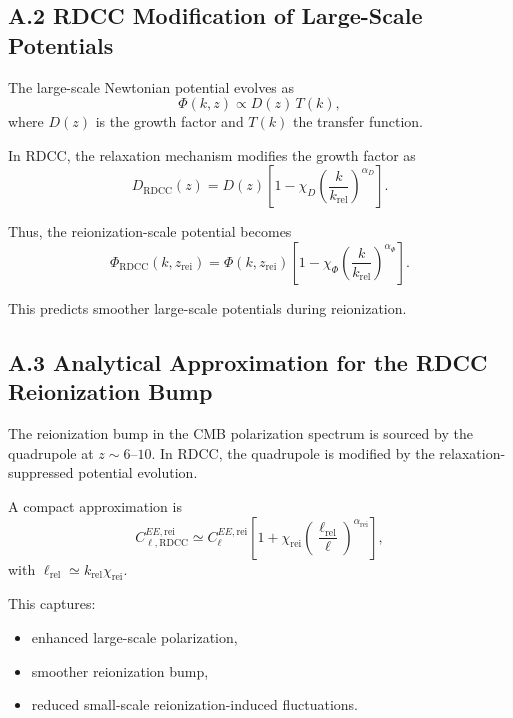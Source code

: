 \documentclass[11pt,a4paper]{article}
\begin{document}
\subsection*{A.2 RDCC Modification of Large-Scale Potentials}

The large-scale Newtonian potential evolves as
\begin{equation}
\Phi(k,z)
\propto
D(z)\,T(k),
\end{equation}
where $D(z)$ is the growth factor and $T(k)$ the transfer function.

In RDCC, the relaxation mechanism modifies the growth factor as
\begin{equation}
D_{\mathrm{RDCC}}(z)
=
D(z)
\left[
1
-
\chi_{D}
\left(
\frac{k}{k_{\mathrm{rel}}}
\right)^{\alpha_{D}}
\right].
\end{equation}

Thus, the reionization-scale potential becomes
\begin{equation}
\Phi_{\mathrm{RDCC}}(k,z_{\mathrm{rei}})
=
\Phi(k,z_{\mathrm{rei}})
\left[
1
-
\chi_{\Phi}
\left(
\frac{k}{k_{\mathrm{rel}}}
\right)^{\alpha_{\Phi}}
\right].
\end{equation}

This predicts smoother large-scale potentials during reionization.

\subsection*{A.3 Analytical Approximation for the RDCC Reionization Bump}

The reionization bump in the CMB polarization spectrum is sourced by the quadrupole at
$z \sim 6$–$10$. In RDCC, the quadrupole is modified by the relaxation-suppressed potential
evolution.

A compact approximation is
\begin{equation}
C_{\ell,\mathrm{RDCC}}^{EE,\mathrm{rei}}
\simeq
C_{\ell}^{EE,\mathrm{rei}}
\left[
1
+
\chi_{\mathrm{rei}}
\left(
\frac{\ell_{\mathrm{rel}}}{\ell}
\right)^{\alpha_{\mathrm{rei}}}
\right],
\end{equation}
with $\ell_{\mathrm{rel}} \simeq k_{\mathrm{rel}}\chi_{\mathrm{rei}}$.

This captures:
\begin{itemize}
\item enhanced large-scale polarization,
\item smoother reionization bump,
\item reduced small-scale reionization-induced fluctuations.
\end{itemize}
\end{document}
